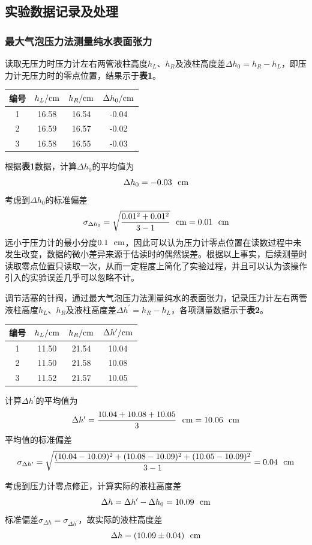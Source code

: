 \documentclass[12pt]{article}
\begin{document}
 \subsection{实验数据记录及处理}
 \subsubsection{最大气泡压力法测量纯水表面张力}
读取无压力时压力计左右两管液柱高度$h_{L}$、$h_{R}$及液柱高度差$\Delta h_{0}=h_{R}-h_{L}$，即压力计无压力时的零点位置，结果示于\textbf{表1}。
\begin{table}[h]
	\centering
	\begin{tabular}{cccc}
		\toprule
		编号 & $h_{L}/{\rm cm}$ & $h_{R}/{\rm cm}$ & $\Delta h_{0}/{\rm cm}$ \\
		\midrule
		1 & 16.58 & 16.54 & -0.04 \\
		2 & 16.59 & 16.57 & -0.02\\
		3 & 16.58 & 16.55 & -0.03\\
		\bottomrule
	\end{tabular}
\end{table}
\par
根据\textbf{表1}数据，计算$\Delta h_{0}$的平均值为
$$\Delta h_{0}=-0.03\ \ {\rm cm}
$$
考虑到$\Delta h_{0}$的标准偏差
$$
\sigma_{\Delta h_{0}}=\sqrt{\frac{0.01^{2}+0.01^2}{3-1}} \ \ {\rm cm}=0.01\ \ {\rm cm}
$$
远小于压力计的最小分度$0.1\ \ {\rm cm}$，因此可以认为压力计零点位置在读数过程中未发生改变，数据的微小差异来源于估读时的偶然误差。根据以上事实，后续测量时读取零点位置只读取一次，从而一定程度上简化了实验过程，并且可以认为该操作引入的实验误差几乎可以忽略不计。\par
调节活塞的针阀，通过最大气泡压力法测量纯水的表面张力，记录压力计左右两管液柱高度$h_{L}$、$h_{R}$及液柱高度差$\Delta h^{\prime}=h_{R}-h_{L}$，各项测量数据示于\textbf{表2}。
\begin{table}[h]
	\centering
	\begin{tabular}{cccc}
		\toprule
		编号 & $h_{L}/{\rm cm}$ & $h_{R}/{\rm cm}$ & $\Delta h^{\prime}/{\rm cm}$ \\
		\midrule
		1 & 11.50 & 21.54 & 10.04 \\
		2 & 11.50 & 21.58 & 10.08\\
		3 & 11.52 & 21.57 & 10.05\\
		\bottomrule
	\end{tabular}
\end{table}
\par 
计算$\Delta h^{\prime}$的平均值为
$$
\Delta h^{\prime}=\frac{10.04+10.08+10.05}{3}\ \ {\rm cm} =10.06\ \ {\rm cm}
$$
平均值的标准偏差
$$
\sigma_{\Delta h^{\prime}}=\sqrt{\frac{(10.04-10.09)^{2}+(10.08-10.09)^{2}+(10.05-10.09)^{2}}{3-1}}=0.04\ \ {\rm cm}
$$
\par 
考虑到压力计零点修正，计算实际的液柱高度差
$$\Delta h=\Delta h^{\prime}-\Delta h_{0} =10.09\ \ {\rm cm}$$
标准偏差$\sigma_{\Delta h}=\sigma_{\Delta h^{\prime}}$，故实际的液柱高度差
$$
\Delta h=(10.09\pm 0.04)\ \ {\rm cm}
$$
\end{document}
